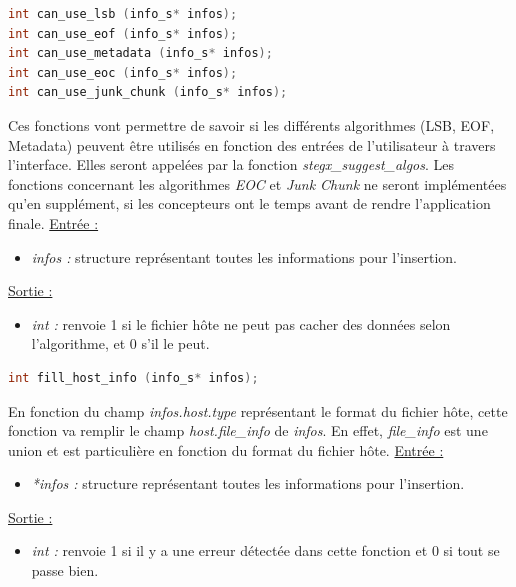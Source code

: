 \documentclass[11pt]{article}
\begin{document}
\begin{lstlisting}[language=c]
int can_use_lsb (info_s* infos);
int can_use_eof (info_s* infos);
int can_use_metadata (info_s* infos);
int can_use_eoc (info_s* infos);
int can_use_junk_chunk (info_s* infos);
\end{lstlisting}

Ces fonctions vont permettre de savoir si les différents algorithmes 
(LSB, EOF, Metadata) peuvent être utilisés en fonction des entrées 
de l'utilisateur à travers l'interface. 
Elles seront appelées par la fonction \textit{stegx\_suggest\_algos}. 
Les fonctions concernant les algorithmes \textit{EOC} et \textit{Junk Chunk} 
ne seront implémentées qu'en supplément, si les concepteurs ont le temps 
avant de rendre l'application finale. 
\newline
\underline{Entrée :} 
\begin{itemize}
\item \textit{infos :} structure représentant toutes les informations pour 
l'insertion.  
\end{itemize}
\underline{Sortie :} 
\begin{itemize}
\item \textit{int :} renvoie 1 si le fichier hôte ne peut pas cacher des 
données selon l'algorithme, et 0 s'il le peut. 
\newline 
\end{itemize}

\begin{lstlisting}[language=c]
int fill_host_info (info_s* infos);
\end{lstlisting}

En fonction du champ \textit{infos.host.type} représentant le format du 
fichier hôte, cette fonction va remplir le champ \textit{host.file\_info} 
de \textit{infos}. En effet, \textit{file\_info} est une union et est 
particulière en fonction du format du fichier hôte. 
\newline
\underline{Entrée :} 
\begin{itemize}
\item \textit{*infos :} structure représentant toutes les informations pour 
l'insertion. 
\end{itemize}
\underline{Sortie :} 
\begin{itemize}
\item \textit{int :} renvoie 1 si il y a une erreur détectée dans cette 
fonction et 0 si tout se passe bien. 
\newline 
\end{itemize}
\end{document}

